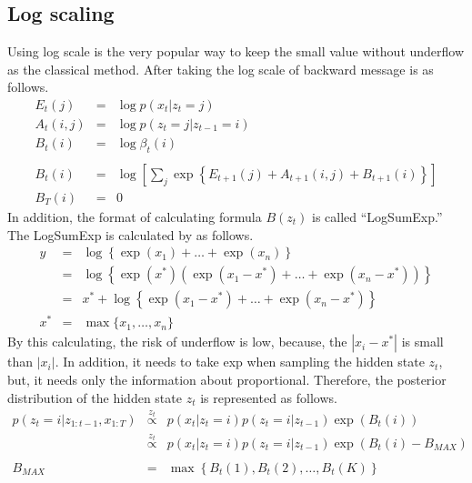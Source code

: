 \documentclass[a4paper]{article}
\newcommand{\proptoas}[1]{\overset{#1}{\propto}}
\begin{document}
\subsection{Log scaling}
Using log scale is the very popular way to keep the small value without underflow as the classical method.
After taking the log scale of backward message is as follows.
\begin{eqnarray}
	E_{t}(j) &=& \log{p(x_{t} | z_{t} = j)}\\
	A_{t}(i, j) &=& \log{p(z_t = j | z_{t-1} = i)}\\
	B_t(i) &=& \log{\beta_t(i)}\\
	\nonumber \\
	B_t(i) &=& \log{\left[\sum_{j}{\exp{ \left\{ E_{t+1}(j) + A_{t+1}(i, j) + B_{t+1}(i) \right\}}}\right]} \\
	B_T(i) &=& 0
\end{eqnarray}
In addition, the format of calculating formula $B(z_t)$ is called ``LogSumExp.''
The LogSumExp is calculated by as follows.
\begin{eqnarray}
	y &=& \log{\left\{ \exp{(x_1)} + \ldots + \exp{(x_n)} \right\}} \\
	&=& \log{\left\{ \exp{(x^*)} \left( \exp{(x_1 - x^*)} + \ldots + \exp{(x_n - x^*)} \right)\right\}} \\
	&=& x^* + \log{\left\{ \exp{(x_1 - x^*)} + \ldots + \exp{(x_n - x^*)} \right\}} \\
	x^* &=& \max{\{ x_1, \ldots, x_n \}}
\end{eqnarray}
By this calculating, the risk of underflow is low, because, the $|x_i - x^*|$ is small than $|x_i|$.
In addition, it needs to take exp when sampling the hidden state $z_t$, but, it needs only the information about proportional.
Therefore, the posterior distribution of the hidden state $z_t$ is represented as follows.
\begin{eqnarray}
	p(z_{t} = i | z_{1:t-1}, x_{1:T})
	&\proptoas{z_t}&
	p(x_t | z_t = i) p(z_t = i | z_{t-1}) \exp{\left(B_t(i)\right)} \\
	&\proptoas{z_t}&
	p(x_t | z_t = i) p(z_t = i | z_{t-1}) \exp{\left(B_t(i) - B_{MAX}\right)} \\
	\nonumber \\
	B_{MAX} &=& \max{\left\{ B_t(1), B_t(2), \ldots, B_t(K)\right\}}
\end{eqnarray}
\end{document}
